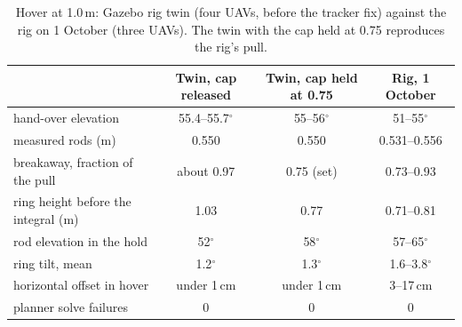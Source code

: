 \begin{table}[h]
\centering
\small
\caption{Hover at 1.0\,m: Gazebo rig twin (four UAVs, before the tracker fix) against the rig on
1 October (three UAVs). The twin with the cap held at 0.75 reproduces the rig's pull.}
\label{tab:sim_vs_rig}
\begin{tabularx}{\textwidth}{>{\raggedright\arraybackslash}Xccc}
\toprule
 & Twin, cap released & Twin, cap held at 0.75 & Rig, 1 October \\
\midrule
hand-over elevation & 55.4--55.7$^\circ$ & 55--56$^\circ$ & 51--55$^\circ$ \\
measured rods (m) & 0.550 & 0.550 & 0.531--0.556 \\
breakaway, fraction of the pull & about 0.97 & 0.75 (set) & 0.73--0.93 \\
ring height before the integral (m) & 1.03 & 0.77 & 0.71--0.81 \\
rod elevation in the hold & 52$^\circ$ & 58$^\circ$ & 57--65$^\circ$ \\
ring tilt, mean & 1.2$^\circ$ & 1.3$^\circ$ & 1.6--3.8$^\circ$ \\
horizontal offset in hover & under 1\,cm & under 1\,cm & 3--17\,cm \\
planner solve failures & 0 & 0 & 0 \\
\bottomrule
\end{tabularx}
\end{table}
